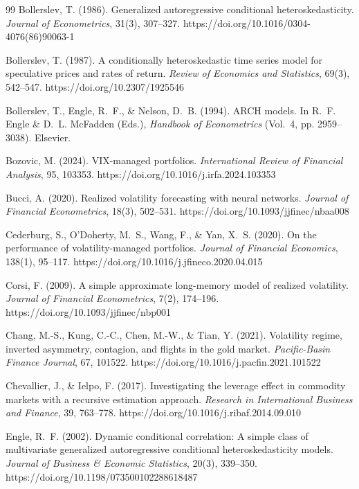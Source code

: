 \documentclass[12pt,a4paper]{article}
\begin{document}
\begin{thebibliography}{99}
Bollerslev, T. (1986). Generalized autoregressive conditional heteroskedasticity. \textit{Journal of Econometrics}, 31(3), 307--327. https://doi.org/10.1016/0304-4076(86)90063-1

Bollerslev, T. (1987). A conditionally heteroskedastic time series model for speculative prices and rates of return. \textit{Review of Economics and Statistics}, 69(3), 542--547. https://doi.org/10.2307/1925546

Bollerslev, T., Engle, R.~F., \& Nelson, D.~B. (1994). ARCH models. In R.~F. Engle \& D.~L. McFadden (Eds.), \textit{Handbook of Econometrics} (Vol.~4, pp. 2959--3038). Elsevier.

Bozovic, M. (2024). VIX-managed portfolios. \textit{International Review of Financial Analysis}, 95, 103353. https://doi.org/10.1016/j.irfa.2024.103353

Bucci, A. (2020). Realized volatility forecasting with neural networks. \textit{Journal of Financial Econometrics}, 18(3), 502--531. https://doi.org/10.1093/jjfinec/nbaa008

Cederburg, S., O'Doherty, M.~S., Wang, F., \& Yan, X.~S. (2020). On the performance of volatility-managed portfolios. \textit{Journal of Financial Economics}, 138(1), 95--117. https://doi.org/10.1016/j.jfineco.2020.04.015

Corsi, F. (2009). A simple approximate long-memory model of realized volatility. \textit{Journal of Financial Econometrics}, 7(2), 174--196. https://doi.org/10.1093/jjfinec/nbp001

Chang, M.-S., Kung, C.-C., Chen, M.-W., \& Tian, Y. (2021). Volatility regime, inverted asymmetry, contagion, and flights in the gold market. \textit{Pacific-Basin Finance Journal}, 67, 101522. https://doi.org/10.1016/j.pacfin.2021.101522

Chevallier, J., \& Ielpo, F. (2017). Investigating the leverage effect in commodity markets with a recursive estimation approach. \textit{Research in International Business and Finance}, 39, 763--778. https://doi.org/10.1016/j.ribaf.2014.09.010

Engle, R.~F. (2002). Dynamic conditional correlation: A simple class of multivariate generalized autoregressive conditional heteroskedasticity models. \textit{Journal of Business \& Economic Statistics}, 20(3), 339--350. https://doi.org/10.1198/073500102288618487


\end{thebibliography}
\end{document}
